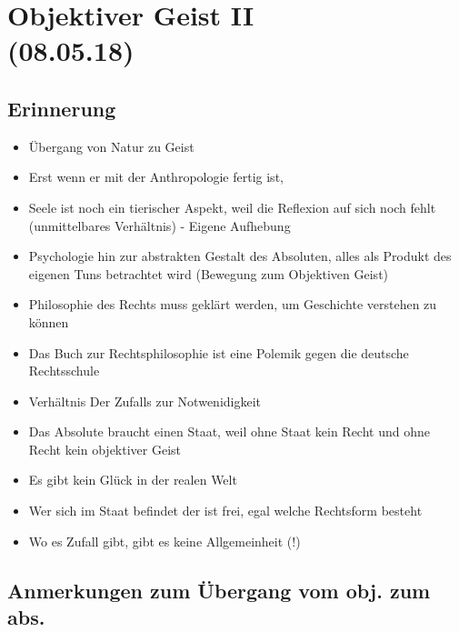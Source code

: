 \documentclass[emulatestandardclasses]{scrartcl}
\begin{document}
\section{Objektiver Geist II\\(08.05.18)}

\subsection{Erinnerung}

\begin{itemize}
  \item Übergang von Natur zu Geist
  \item Erst wenn er mit der Anthropologie fertig ist, 
  \item Seele ist noch ein tierischer Aspekt, weil die Reflexion auf sich noch fehlt (unmittelbares Verhältnis) - Eigene Aufhebung
  \item Psychologie hin zur abstrakten Gestalt des Absoluten, alles als Produkt des eigenen Tuns betrachtet wird (Bewegung zum Objektiven Geist)
  \item Philosophie des Rechts muss geklärt werden, um Geschichte verstehen zu können
  \item Das Buch zur Rechtsphilosophie ist eine Polemik gegen die deutsche Rechtsschule
  \item Verhältnis Der Zufalls zur Notwenidigkeit
  \item Das Absolute braucht einen Staat, weil ohne Staat kein Recht und ohne Recht kein objektiver Geist
  \item Es gibt kein Glück in der realen Welt
  \item Wer sich im Staat befindet der ist frei, egal welche Rechtsform besteht
  \item Wo es Zufall gibt, gibt es keine Allgemeinheit (!)
\end{itemize}

\subsection{Anmerkungen zum Übergang vom obj. zum abs.}
\end{document}
